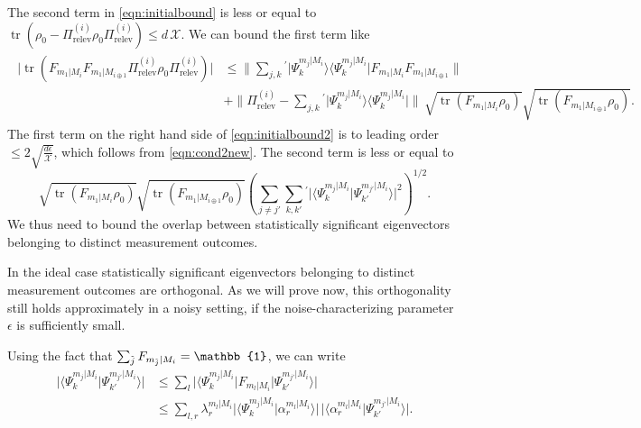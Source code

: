 The second term in \ref{eqn:initialbound} is less or equal to $\operatorname{tr}(\rho_0-\Pi_{\text{relev}}^{(i)}\rho_0\Pi_{\text{relev}}^{(i)})\leq d\,\mathcal{X}$. We can bound the first term like
\begin{align}
\label{eqn:initialbound2}
\begin{split}
\vert \operatorname{tr}(F_{m_1\vert M_i} F_{m_1\vert M_{i \oplus 1}}\Pi_{\text{relev}}^{(i)}\rho_0\Pi_{\text{relev}}^{(i)})\vert & \leq  \|\sum_{j,k} {}^{'} \vert \Psi_k^{m_j\vert M_i}\rangle \langle \Psi_k^{m_j\vert M_i} \vert F_{m_1\vert M_i} F_{m_1 \vert M_{i\oplus 1}}\| \\
& + \|\Pi_{\text{relev}}^{(i)} - \sum_{j,k} {}^{'} \vert \Psi_k^{m_j\vert M_i}\rangle \langle \Psi_k^{m_j\vert M_i} \vert \| \, \sqrt{\operatorname{tr}(F_{m_1\vert M_i}\rho_0)}\sqrt{\operatorname{tr}(F_{m_1\vert M_{i\oplus 1}}\rho_0)}.
\end{split}
\end{align}
The first term on the right hand side of \ref{eqn:initialbound2} is to leading order $\leq 2\sqrt{\frac{d\epsilon}{\mathcal{X}}}$, which follows from \ref{eqn:cond2new}. The second term is less or equal to
\begin{equation}
\label{eqn:tobound}
\sqrt{\operatorname{tr}(F_{m_1\vert M_i}\rho_0)}\sqrt{\operatorname{tr}(F_{m_1\vert M_{i\oplus 1}}\rho_0)}\left(\sum_{j\neq j'}\sum_{k,k'}{}^{'}\vert \langle \Psi_k^{m_j\vert M_i}\vert \Psi_{k'}^{m_{j'}\vert M_i} \rangle \vert^2\right)^{1/2}.
\end{equation}
We thus need to bound the overlap between statistically significant eigenvectors belonging to distinct measurement outcomes.

In the ideal case statistically significant eigenvectors belonging to distinct measurement outcomes are orthogonal. As we will prove now, this orthogonality still holds approximately in a noisy setting, if the noise-characterizing parameter $\epsilon$ is sufficiently small.

Using the fact that $\sum_{\Tilde{j}}F_{m_{\Tilde{j}}\vert M_i}=\mathbb{1}$, we can write
\begin{align}
\vert\langle \Psi_k^{m_j\vert M_i} \vert \Psi_{k'}^{m_{j'}\vert M_i}\rangle \vert & \leq \sum_l \vert \langle \Psi_k^{m_j\vert M_i} \vert F_{m_l\vert M_i}\vert \Psi_{k'}^{m_{j'}\vert M_i}\rangle\vert \\
\label{eqn:toinsert}
& \leq \sum_{l,r}\lambda_r^{m_l\vert M_i}\vert \langle \Psi_k^{m_j\vert M_i} \vert \alpha_r^{m_l\vert M_i}\rangle \vert \, \vert \langle \alpha_r^{m_l\vert M_i}\vert \Psi_{k'}^{m_{j'}\vert M_i}\rangle \vert.
\end{align}

